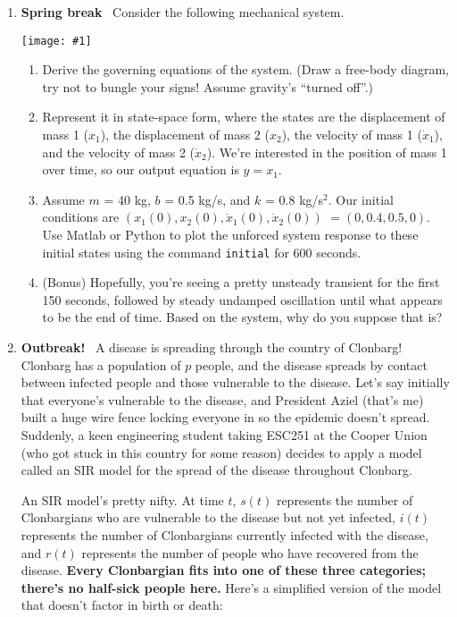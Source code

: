 \documentclass{report}
\newcommand{\bicture}[1]{
\begin{center}
    {\texttt{[image: \#1]}}
\end{center}}
\begin{document}
\begin{onehalfspacing}
\begin{flushleft}

\begin{enumerate}
    \item \textbf{Spring break} \, Consider the following mechanical system.
    \bicture{p1}
    \begin{enumerate}
        \item Derive the governing equations of the system. (Draw a free-body diagram, try not to bungle your signs! Assume gravity's ``turned off''.)
        \item Represent it in state-space form, where the states are the displacement of mass 1 (\(x_1\)), the displacement of mass 2 (\(x_2\)), the velocity of mass 1 (\(\dot{x}_1\)), and the velocity of mass 2 (\(\dot{x}_2\)). We're interested in the position of mass 1 over time, so our output equation is \(y = x_1\).
        \item Assume \(m\) = 40 kg, \(b\) = 0.5 kg/s, and \(k\) = 0.8 kg/s\(^2\). Our initial conditions are \((x_1(0), x_2(0), \dot{x}_1(0), \dot{x}_2(0))\) \(= (0, 0.4, 0.5, 0)\). Use Matlab or Python to plot the unforced system response to these initial states using the command \texttt{initial} for 600 seconds.
        \item (Bonus) Hopefully, you're seeing a pretty unsteady transient for the first 150 seconds, followed by steady undamped oscillation until what appears to be the end of time. Based on the system, why do you suppose that is?
    \end{enumerate}
    \item \textbf{Outbreak!} \, A disease is spreading through the country of Clonbarg! Clonbarg has a population of \(p\) people, and the disease spreads by contact between infected people and those vulnerable to the disease. Let's say initially that everyone's vulnerable to the disease, and President Aziel (that's me) built a huge wire fence locking everyone in so the epidemic doesn't spread. Suddenly, a keen engineering student taking ESC251 at the Cooper Union (who got stuck in this country for some reason) decides to apply a model called an SIR model for the spread of the disease throughout Clonbarg.
    
    \medskip

    An SIR model's pretty nifty. At time \(t\), \(s(t)\) represents the number of Clonbargians who are vulnerable to the disease but not yet infected, \(i(t)\) represents the number of Clonbargians currently infected with the disease, and \(r(t)\) represents the number of people who have recovered from the disease. \textbf{Every Clonbargian fits into one of these three categories; there's no half-sick people here.} Here's a simplified version of the model that doesn't factor in birth or death:


\end{enumerate}
\end{flushleft}
\end{onehalfspacing}
\end{document}
